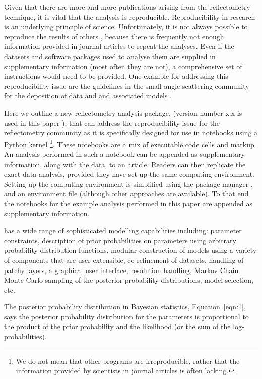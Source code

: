 \documentclass[12pt]{article}
\begin{document}
Given that there are more and more publications arising from the reflectometry technique, it is vital that the analysis is reproducible. Reproducibility in research is an underlying principle of science. Unfortunately, it is not always possible to reproduce the results of others \cite{Stark2018}, because there is frequently not enough information provided in journal articles to repeat the analyses. Even if the datasets and software packages used to analyse them are supplied in supplementary information (most often they are not), a comprehensive set of instructions would need to be provided.
One example for addressing this reproducibility issue are the guidelines in the small-angle scattering community for the deposition of data and and associated models \cite{Trewhella:jc5010}.

Here we outline a new reflectometry analysis package,  (version number x.x is used in this paper \cite{refnx}), that can address the reproducibility issue for the reflectometry community as it is specifically designed for use in \Jupyter notebooks \cite{Kluyver:2016aa} using a Python kernel \footnote{We do not mean that other programs are irreproducible, rather that the information provided by scientists in journal articles is often lacking.}.
These notebooks are a mix of executable code cells and markup. An analysis performed in such a notebook can be appended as supplementary information, along with the data, to an article. Readers can then replicate the exact data analysis, provided they have set up the same computing environment. Setting up the computing environment is simplified using the \conda package manager \cite{conda}, and an environment file (although other approaches are available). To that end the \Jupyter notebooks for the example analysis performed in this paper are appended as supplementary information.

 has a wide range of sophisticated modelling capabilities including: parameter constraints, description of prior probabilities on parameters using arbitrary probability distribution functions, modular construction of models using a variety of components that are user extensible, co-refinement of datasets, handling of patchy layers, a graphical user interface, resolution handling, Markov Chain Monte Carlo sampling of the posterior probability distributions, model selection, etc.

The posterior probability distribution in Bayesian statistics, Equation~\ref{eqn:1}, says the posterior probability distribution for the parameters is proportional to the product of the prior probability and the likelihood (or the sum of the log-probabilities).
\end{document}
